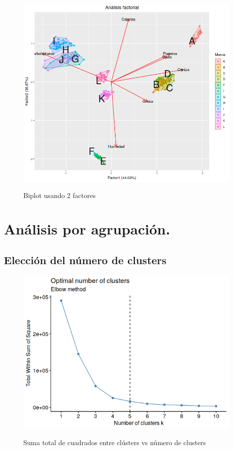 \documentclass[pdf]{beamer}
\begin{document}
\begin{frame}
\begin{figure}[h]
\centering
	\includegraphics[scale=.35]{images/biplotFactores.png} 
	\label{i_biplot_Factores}
	\caption{Biplot usando 2 factores}
\end{figure}
\end{frame}

\section{Análisis por agrupación.}

\subsection{Elección del número de clusters}

\begin{frame}
\begin{figure}[h]
\centering
	\includegraphics[scale=.5]{images/clusterElbow.png} 
	\label{i_cluster_Elbow}
	\caption{Suma total de cuadrados entre clústers vs número de clusters}
\end{figure}
\end{frame}
\end{document}
